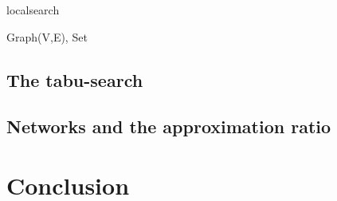 \documentclass [12pt]{article}
\begin{document}
\begin {algorithm} [H]
\caption {localsearch}
\begin {algorithmic} [3]
\Require Graph(V,E), Set
\end {algorithmic}
\end {algorithm}
\subsection{The tabu-search}
\subsection{Networks and the approximation ratio}
\section{Conclusion}


\end{document}
